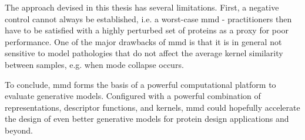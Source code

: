 The approach devised in this thesis has several limitations. First, a negative
control cannot always be established, i.e. a worst-case \acrshort{mmd} - practitioners then
have to be satisfied with a highly perturbed set of proteins as a proxy for poor
performance. One of the major drawbacks of \acrshort{mmd} is that it is in general not
sensitive to model pathologies that do not affect the average kernel similarity
between samples, e.g. when mode collapse occurs.

To conclude, \acrshort{mmd} forms the basis of a powerful computational platform to
evaluate generative models. Configured with a powerful combination of
representations, descriptor functions, and kernels, \acrshort{mmd} could hopefully
accelerate the design of even better generative models for protein design
applications and beyond.
